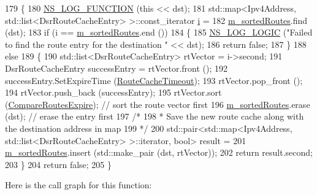 \begin{DoxyCode}
179 \{
180   \hyperlink{log-macros-disabled_8h_a90b90d5bad1f39cb1b64923ea94c0761}{NS\_LOG\_FUNCTION} (\textcolor{keyword}{this} << dst);
181   std::map<Ipv4Address, std::list<DsrRouteCacheEntry> >::const\_iterator \hyperlink{bernuolliDistribution_8m_a6f6ccfcf58b31cb6412107d9d5281426}{i} =
182     \hyperlink{classns3_1_1dsr_1_1DsrRouteCache_a8d3530713c7152dbe42d0b616d9c1d96}{m\_sortedRoutes}.find (dst);
183   \textcolor{keywordflow}{if} (i == \hyperlink{classns3_1_1dsr_1_1DsrRouteCache_a8d3530713c7152dbe42d0b616d9c1d96}{m\_sortedRoutes}.end ())
184     \{
185       \hyperlink{group__logging_ga88acd260151caf2db9c0fc84997f45ce}{NS\_LOG\_LOGIC} (\textcolor{stringliteral}{"Failed to find the route entry for the destination "} << dst);
186       \textcolor{keywordflow}{return} \textcolor{keyword}{false};
187     \}
188   \textcolor{keywordflow}{else}
189     \{
190       std::list<DsrRouteCacheEntry> rtVector = i->second;
191       DsrRouteCacheEntry successEntry = rtVector.front ();
192       successEntry.SetExpireTime (\hyperlink{classns3_1_1dsr_1_1DsrRouteCache_a6a2bdf2226910392a4578cc82216acaf}{RouteCacheTimeout});
193       rtVector.pop\_front ();
194       rtVector.push\_back (successEntry);
195       rtVector.sort (\hyperlink{namespacens3_1_1dsr_a53bce2b069de9151de0203d96468684e}{CompareRoutesExpire});      \textcolor{comment}{// sort the route vector first}
196       \hyperlink{classns3_1_1dsr_1_1DsrRouteCache_a8d3530713c7152dbe42d0b616d9c1d96}{m\_sortedRoutes}.erase (dst);               \textcolor{comment}{// erase the entry first}
197       \textcolor{comment}{/*}
198 \textcolor{comment}{       * Save the new route cache along with the destination address in map}
199 \textcolor{comment}{       */}
200       std::pair<std::map<Ipv4Address, std::list<DsrRouteCacheEntry> >::iterator, \textcolor{keywordtype}{bool}> result =
201         \hyperlink{classns3_1_1dsr_1_1DsrRouteCache_a8d3530713c7152dbe42d0b616d9c1d96}{m\_sortedRoutes}.insert (std::make\_pair (dst, rtVector));
202       \textcolor{keywordflow}{return} result.second;
203     \}
204   \textcolor{keywordflow}{return} \textcolor{keyword}{false};
205 \}
\end{DoxyCode}


Here is the call graph for this function\+:



